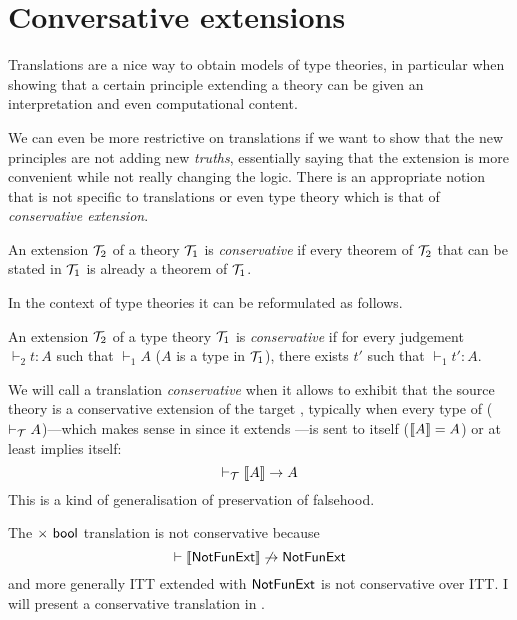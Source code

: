 \section{Conversative extensions}

Translations are a nice way to obtain models of type theories, in particular
when showing that a certain principle extending a theory can be given an
interpretation and even computational content.

We can even be more restrictive on translations if we want to show that the new
principles are not adding new \emph{truths}, essentially saying that the
extension is more convenient while not really changing the logic.
There is an appropriate notion that is not specific to translations or even
type theory which is that of \emph{conservative extension}.

\begin{definition}
  An extension \(\mathcal{T}_2\) of a theory \(\mathcal{T}_1\) is \emph{conservative} if every
  theorem of \(\mathcal{T}_2\) that can be stated in \(\mathcal{T}_1\) is already a theorem of
  \(\mathcal{T}_1\).
\end{definition}

In the context of type theories it can be reformulated as follows.

\begin{definition}
  An extension \(\mathcal{T}_2\) of a type theory \(\mathcal{T}_1\) is \emph{conservative} if
  for every judgement \(\vdash_2 t : A\) such that \(\vdash_1 A\)
  (\ie \(A\) is a type in \(\mathcal{T}_1\)), there exists \(t'\) such that
  \(\vdash_1 t' : A\).
\end{definition}

We will call a translation \emph{conservative} when it allows to exhibit that
the source theory \cS is a conservative extension of the target \cT, typically
when every type of \cT (\ie \(\vdash_\mathcal{T} A\))---which makes sense in \cS since
it extends \cT---is sent to itself (\(\llbracket A \rrbracket = A\)) or at least implies
itself:
\[
  \vdash_\mathcal{T} \llbracket A \rrbracket \to A
\]
This is a kind of generalisation of preservation of falsehood.

The \(\times\ \mathsf{bool}\) translation is not conservative because
\[
  \vdash \llbracket \mathsf{NotFunExt} \rrbracket \not\to \mathsf{NotFunExt}
\]
and more generally \acrshort{ITT} extended with \(\mathsf{NotFunExt}\) is not
conservative over \acrshort{ITT}.
I will present a conservative translation in .

